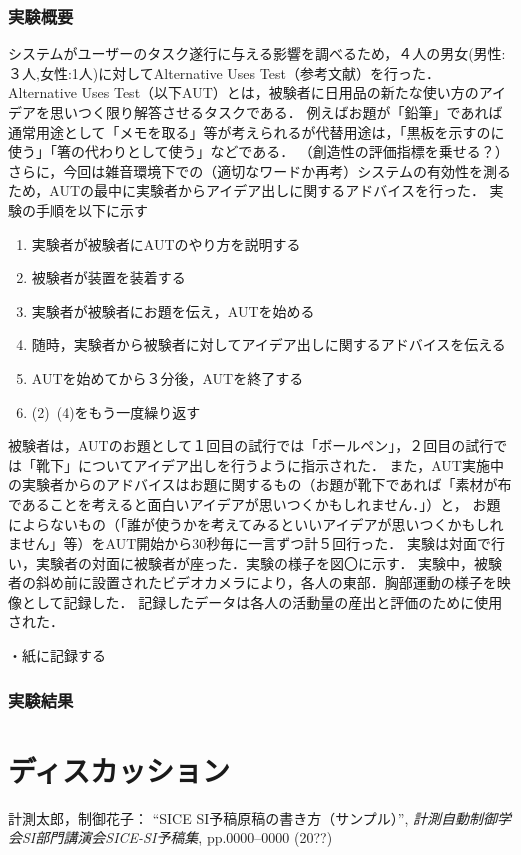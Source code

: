 \documentclass[a4paper]{jarticle}
\begin{document}
\subsubsection{実験概要}
システムがユーザーのタスク遂行に与える影響を調べるため，４人の男女(男性:３人,女性:1人)に対してAlternative Uses Test（参考文献）を行った．
Alternative Uses Test（以下AUT）とは，被験者に日用品の新たな使い方のアイデアを思いつく限り解答させるタスクである．
例えばお題が「鉛筆」であれば通常用途として「メモを取る」等が考えられるが代替用途は，「黒板を示すのに使う」「箸の代わりとして使う」などである．
（創造性の評価指標を乗せる？）
さらに，今回は雑音環境下での（適切なワードか再考）システムの有効性を測るため，AUTの最中に実験者からアイデア出しに関するアドバイスを行った．
実験の手順を以下に示す
\begin{enumerate}
    \item 実験者が被験者にAUTのやり方を説明する
    \item 被験者が装置を装着する
    \item 実験者が被験者にお題を伝え，AUTを始める
    \item 随時，実験者から被験者に対してアイデア出しに関するアドバイスを伝える
    \item AUTを始めてから３分後，AUTを終了する
    \item (2)~(4)をもう一度繰り返す
\end{enumerate}
被験者は，AUTのお題として１回目の試行では「ボールペン」，２回目の試行では「靴下」についてアイデア出しを行うように指示された．
また，AUT実施中の実験者からのアドバイスはお題に関するもの（お題が靴下であれば「素材が布であることを考えると面白いアイデアが思いつくかもしれません．」）と，
お題によらないもの（「誰が使うかを考えてみるといいアイデアが思いつくかもしれません」等）をAUT開始から30秒毎に一言ずつ計５回行った．
実験は対面で行い，実験者の対面に被験者が座った．実験の様子を図〇に示す．
実験中，被験者の斜め前に設置されたビデオカメラにより，各人の東部．胸部運動の様子を映像として記録した．
記録したデータは各人の活動量の産出と評価のために使用された．

・紙に記録する


\subsubsection{実験結果}
\section{ディスカッション}
%
%
\begin{thebibliography}{99}
	計測太郎，制御花子：
	``SICE SI予稿原稿の書き方（サンプル）'',  
   {\it 計測自動制御学会SI部門講演会SICE-SI予稿集}, 
    pp.0000--0000 (20??)
\end{thebibliography}
%
%
%
\end{document}

